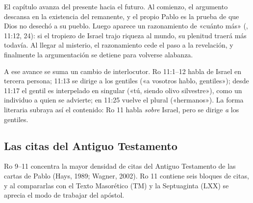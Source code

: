 El capítulo avanza del presente hacia el futuro. Al comienzo, el argumento descansa en la existencia del remanente, y el propio Pablo es la prueba de que Dios no desechó a su pueblo. Luego aparece un razonamiento de «cuánto más» (, 11:12, 24): si el tropiezo de Israel trajo riqueza al mundo, su plenitud traerá más todavía. Al llegar al misterio, el razonamiento cede el paso a la revelación, y finalmente la argumentación se detiene para volverse alabanza.

A ese avance se suma un cambio de interlocutor. Ro 11:1--12 habla de Israel en tercera persona; 11:13 se dirige a los gentiles («a vosotros hablo, gentiles»); desde 11:17 el gentil es interpelado en singular («tú, siendo olivo silvestre»), como un individuo a quien se advierte; en 11:25 vuelve el plural («hermanos»). La forma literaria subraya así el contenido: Ro 11 habla \emph{sobre} Israel, pero se dirige \emph{a} los gentiles.

\subsection{Las citas del Antiguo Testamento}
Ro 9--11 concentra la mayor densidad de citas del Antiguo Testamento de las cartas de Pablo (Hays, 1989; Wagner, 2002). Ro 11 contiene seis bloques de citas, y al compararlas con el Texto Masorético (TM) y la Septuaginta (LXX) se aprecia el modo de trabajar del apóstol.


